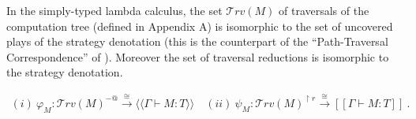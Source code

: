 \documentclass{llncs}
\newcommand\travset{\mathcal{T}rv}
\newcommand{\sem}[1]{{[\![ #1 ]\!]}}
\newcommand{\intersem}[1]{{\langle\!\langle #1 \rangle\!\rangle}}
\begin{document}
In the simply-typed lambda calculus, the set $\travset(M)$ of
traversals of the computation tree (defined in Appendix A) is
isomorphic to the set of uncovered plays of the strategy denotation
(this is the counterpart of the ``Path-Traversal Correspondence'' of
\cite{OngLics2006}). Moreover the set of traversal reductions is
isomorphic to the strategy denotation.

\begin{theorem}
\label{thm:correspondence}
\begin{eqnarray*}
(i) \  \varphi_M  : \travset(M)^{-@} \stackrel{\cong}{\longrightarrow} \intersem{\Gamma \vdash M :T} \quad
(ii) \  \psi_M  : \travset(M )^{\upharpoonright r} \stackrel{\cong}{\longrightarrow} \sem{\Gamma \vdash M : T} \ .
\end{eqnarray*}
\end{theorem}
\end{document}
